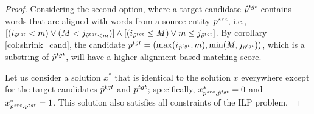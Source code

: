 \begin{proof}
  Considering the second option, where a target candidate \( \hat{p}^{tgt} \) contains words
  that are aligned with words from a source entity \( p^{src} \), i.e.,
  \( \left[ (i_{\hat{p}^{tgt}} < m) \lor (M < j_{\hat{p}^{tgt} < m}) \right] \land
  \left[ (i_{\hat{p}^{tgt}} \leq M) \lor m \leq j_{\hat{p}^{tgt}} \right] \).
  By corollary \ref{col:shrink_cand}, the candidate \( p^{tgt} = ( \max(i_{\hat{p}^{tgt}}, m), \min(M, j_{\hat{p}^{tgt}}) ) \),
  which is a substring of \( \hat{p}^{tgt} \), will have a higher alignment-based
  matching score.

  Let us consider a solution \( x^* \) that is identical to the solution \( x \)
  everywhere except for the target candidates \( \hat{p}^{tgt} \) and \( p^{tgt} \);
  specifically, \( x^*_{p^{src}, \hat{p}^{tgt}} = 0 \) and \( x^*_{p^{src}, p^{tgt}} = 1 \).
  This solution also satisfies all constraints of the ILP problem.


\end{proof}
